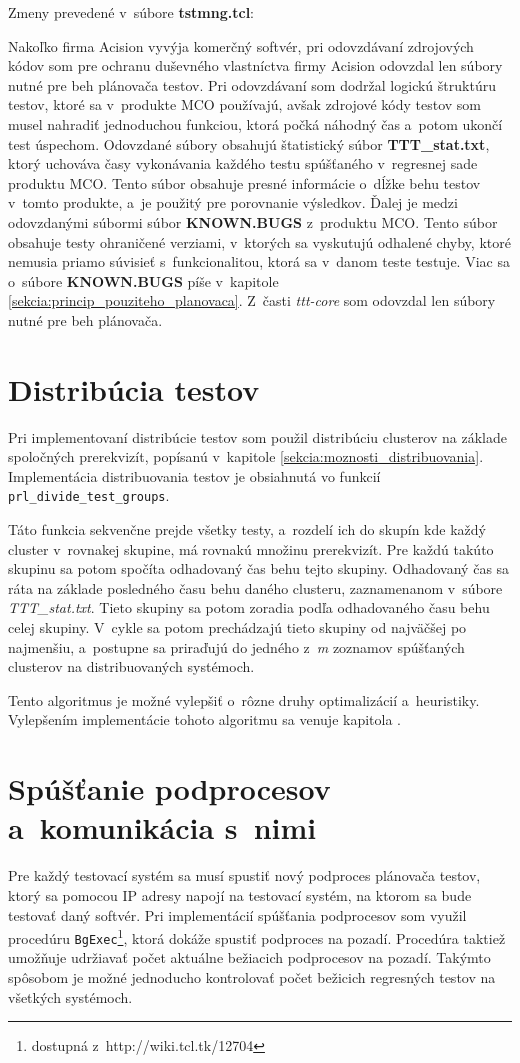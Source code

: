 Zmeny prevedené v~súbore \textbf{tstmng.tcl}:

Nakoľko firma Acision vyvýja komerčný softvér, pri odovzdávaní zdrojových kódov 
som pre ochranu duševného vlastníctva firmy Acision odovzdal len súbory nutné pre 
beh plánovača testov. Pri odovzdávaní som dodržal logickú štruktúru testov, ktoré sa
v~produkte MCO používajú, avšak zdrojové kódy testov som musel nahradiť jednoduchou funkciou,
ktorá počká náhodný čas a~potom ukončí test úspechom.
Odovzdané súbory obsahujú štatistický súbor \textbf{TTT\_stat.txt}, ktorý uchováva časy vykonávania
každého testu spúšťaného v~regresnej sade produktu MCO. Tento súbor obsahuje presné informácie o~dĺžke
behu testov v~tomto produkte, a~je použitý pre porovnanie výsledkov.
Ďalej je medzi odovzdanými súbormi súbor \textbf{KNOWN.BUGS} z~produktu MCO. Tento súbor obsahuje testy
ohraničené verziami, v~ktorých sa vyskutujú odhalené chyby, ktoré nemusia priamo súvisieť
s~funkcionalitou, ktorá sa v~danom teste testuje. Viac sa o~súbore \textbf{KNOWN.BUGS} píše v~kapitole \ref{sekcia:princip_pouziteho_planovaca}.
Z~časti \textit{ttt-core} som odovzdal len súbory nutné pre beh plánovača. 

\section{Distribúcia testov}
\label{sekcia:distribucia_testov}
Pri implementovaní distribúcie testov som použil distribúciu clusterov na základe spoločných prerekvizít, 
popísanú v~kapitole \ref{sekcia:moznosti_distribuovania}.
Implementácia distribuovania testov je obsiahnutá vo funkcií \texttt{prl\_divide\_test\_groups}.

Táto funkcia sekvenčne prejde všetky testy, a~rozdelí ich do skupín kde každý cluster v~rovnakej skupine,
má rovnakú množinu prerekvizít. Pre každú takúto skupinu sa potom spočíta odhadovaný čas behu tejto skupiny.
Odhadovaný čas sa ráta na základe posledného času behu daného clusteru, zaznamenanom v~súbore \textit{TTT\_stat.txt}.
Tieto skupiny sa potom zoradia podľa odhadovaného času behu celej skupiny.
V~cykle sa potom prechádzajú tieto skupiny od najväčšej po najmenšiu, a~postupne sa priraďujú 
do jedného z~\emph{m} zoznamov spúšťaných clusterov na distribuovaných systémoch.

Tento algoritmus je možné vylepšiť o~rôzne druhy optimalizácií a~heuristiky.
Vylepšením implementácie tohoto algoritmu sa venuje kapitola \label{kapitola:optimalizacie}. 


\section{Spúšťanie podprocesov a~komunikácia s~nimi}
\label{sekcia:spustanie_podprocesov}
Pre každý testovací systém sa musí spustiť nový podproces plánovača testov,
ktorý sa pomocou IP adresy napojí na testovací systém, na ktorom sa bude testovať daný softvér.
Pri implementácií spúšťania podprocesov som využil procedúru \texttt{BgExec}\footnote{dostupná z~http://wiki.tcl.tk/12704},
ktorá dokáže spustiť podproces na pozadí. Procedúra taktiež umožňuje udržiavať počet aktuálne bežiacich podprocesov na pozadí.
Takýmto spôsobom je možné jednoducho kontrolovať počet bežicich regresných testov na všetkých systémoch.

